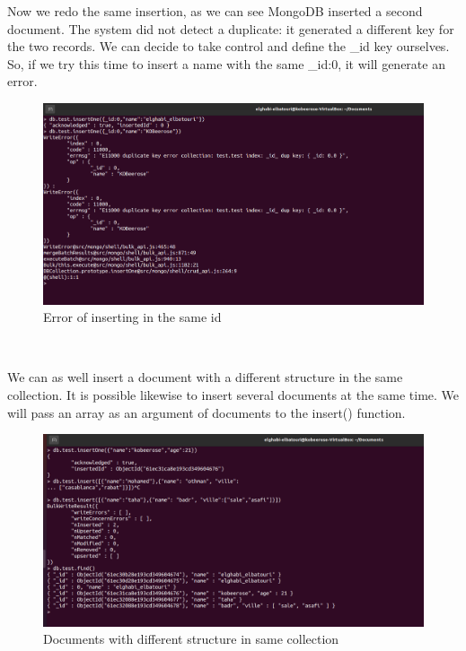 \begin{spacing}{0.9}
\par Now we redo the same insertion, as we can see MongoDB inserted a second document. The system did not detect a duplicate: it generated a different key for the two records.
We can decide to take control and define the \_id key ourselves. So, if we try this time to insert a name with the same \_id:0, it will generate an error.
\\
\begin{figure}[!htb] 
\begin{center} 
\includegraphics[width=1\linewidth]{Pictures/MongoDB/Examining MongoDB Query Features/Inserting documents/Error of inserting in the same id} 
\end{center} 
\caption{Error of inserting in the same id} 
\end{figure}  \FloatBarrier
\\
\newpage
\par We can as well insert a document with a different structure in the same collection. It is possible likewise to insert several documents at the same time. We will pass an array as an argument
of documents to the insert() function.
\\
\begin{figure}[!htb] 
\begin{center} 
\includegraphics[width=1\linewidth]{Pictures/MongoDB/Examining MongoDB Query Features/Inserting documents/Documents with different structure in same collection} 
\end{center} 
\caption{Documents with different structure in same collection} 
\end{figure}  \FloatBarrier
\\

\end{spacing}
